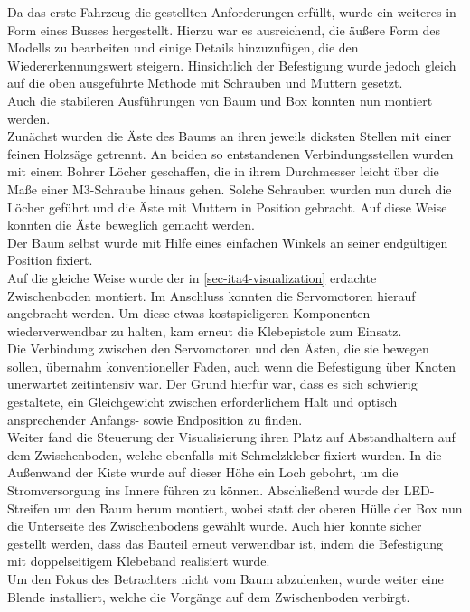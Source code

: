 \documentclass[.../Dokumentation.tex]{subfiles}
\begin{document}
\noindent 
Da das erste Fahrzeug die gestellten Anforderungen erfüllt, wurde ein weiteres 
in Form eines Busses hergestellt. Hierzu war es ausreichend, die äußere Form 
des Modells zu bearbeiten und einige Details hinzuzufügen, die den 
Wiedererkennungswert steigern. Hinsichtlich der Befestigung wurde jedoch 
gleich auf die oben ausgeführte Methode mit Schrauben und Muttern gesetzt.\\
Auch die stabileren Ausführungen von Baum und Box konnten nun montiert werden.\\
Zunächst wurden die Äste des Baums an ihren jeweils dicksten Stellen mit einer 
feinen Holzsäge getrennt. An beiden so entstandenen Verbindungsstellen wurden 
mit einem Bohrer Löcher geschaffen, die in ihrem Durchmesser leicht über die 
Maße einer M3-Schraube hinaus gehen. Solche Schrauben wurden nun durch die 
Löcher geführt und die Äste mit Muttern in Position gebracht. 
Auf diese Weise konnten die Äste beweglich gemacht werden. \\
Der Baum selbst wurde mit Hilfe eines einfachen Winkels an seiner endgültigen 
Position fixiert.\\
Auf die gleiche Weise wurde der in \ref{sec-ita4-visualization} erdachte 
Zwischenboden montiert. Im Anschluss konnten die Servomotoren hierauf angebracht 
werden. Um diese etwas kostspieligeren Komponenten wiederverwendbar zu halten, 
kam erneut die Klebepistole zum Einsatz.\\
Die Verbindung zwischen den Servomotoren und den Ästen, die sie bewegen sollen, 
übernahm konventioneller Faden, auch wenn die Befestigung über Knoten 
unerwartet zeitintensiv war. Der Grund hierfür war, dass es sich schwierig 
gestaltete, ein Gleichgewicht zwischen erforderlichem Halt und  
optisch ansprechender Anfangs- sowie Endposition zu finden.\\
Weiter fand die Steuerung der Visualisierung ihren Platz auf Abstandhaltern auf 
dem Zwischenboden, welche ebenfalls mit Schmelzkleber fixiert wurden.
In die Außenwand der Kiste wurde auf dieser Höhe ein Loch gebohrt, um die 
Stromversorgung ins Innere führen zu können. 
Abschließend wurde der LED-Streifen um den Baum herum montiert, wobei statt der 
oberen Hülle der Box nun die Unterseite des Zwischenbodens gewählt wurde. 
Auch hier konnte sicher gestellt werden, dass das Bauteil erneut verwendbar 
ist, indem die Befestigung mit doppelseitigem Klebeband realisiert wurde.\\
Um den Fokus des Betrachters nicht vom Baum abzulenken, wurde weiter eine 
Blende installiert, welche die Vorgänge auf dem Zwischenboden verbirgt.
\end{document}
